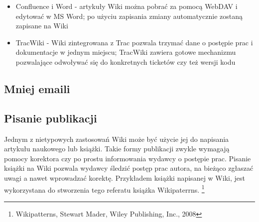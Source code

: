 \documentclass{article}
\begin{document}
\begin{itemize}
\item Confluence i Word - artykuły Wiki można pobrać za pomocą WebDAV i  edytować w MS Word; po użyciu zapisania zmiany automatycznie zostaną zapisane na Wiki
\item TracWiki - Wiki zintegrowana z Trac pozwala trzymać dane o postępie prac i dokumentacje w jednym miejscu; TracWiki zawiera gotowe mechanizmu pozwalające odwoływać się do konkretnych ticketów czy też wersji kodu 

\end{itemize} 




	\subsection{Mniej emaili}



	\subsection{Pisanie publikacji}

	Jednym z nietypowych zastosowań Wiki może być użycie jej do napisania artykułu naukowego lub książki. Takie formy publikacji zwykle wymagają pomocy korektora czy po prostu informowania wydawcy o postępie prac. Pisanie książki na Wiki pozwala wydawcy śledzić postęp prac autora, na bieżąco zgłaszać uwagi a nawet wprowadzać korektę. Przykładem książki napisanej w Wiki, jest wykorzystana  do stworzenia tego referatu książka Wikipaterrns. \footnote{Wikipatterns, Stewart Mader, Wiley Publishing, Inc., 2008}
\end{document}
